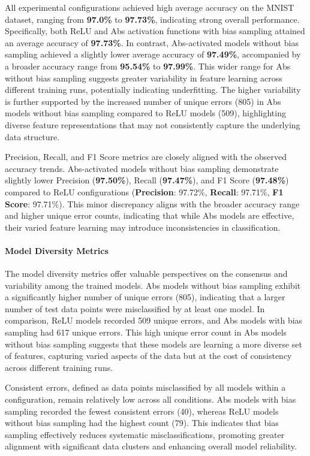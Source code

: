 All experimental configurations achieved high average accuracy on the MNIST dataset, ranging from \textbf{97.0\%} to \textbf{97.73\%}, indicating strong overall performance. Specifically, both ReLU and Abs activation functions with bias sampling attained an average accuracy of \textbf{97.73\%}. In contrast, Abs-activated models without bias sampling achieved a slightly lower average accuracy of \textbf{97.49\%}, accompanied by a broader accuracy range from \textbf{95.54\%} to \textbf{97.99\%}. This wider range for Abs without bias sampling suggests greater variability in feature learning across different training runs, potentially indicating underfitting. The higher variability is further supported by the increased number of unique errors (805) in Abs models without bias sampling compared to ReLU models (509), highlighting diverse feature representations that may not consistently capture the underlying data structure.

Precision, Recall, and F1 Score metrics are closely aligned with the observed accuracy trends. Abs-activated models without bias sampling demonstrate slightly lower Precision (\textbf{97.50\%}), Recall (\textbf{97.47\%}), and F1 Score (\textbf{97.48\%}) compared to ReLU configurations (\textbf{Precision}: 97.72\%, \textbf{Recall}: 97.71\%, \textbf{F1 Score}: 97.71\%). This minor discrepancy aligns with the broader accuracy range and higher unique error counts, indicating that while Abs models are effective, their varied feature learning may introduce inconsistencies in classification.

\paragraph{Model Diversity Metrics}

The model diversity metrics offer valuable perspectives on the consensus and variability among the trained models. Abs models without bias sampling exhibit a significantly higher number of unique errors (805), indicating that a larger number of test data points were misclassified by at least one model. In comparison, ReLU models recorded 509 unique errors, and Abs models with bias sampling had 617 unique errors. This high unique error count in Abs models without bias sampling suggests that these models are learning a more diverse set of features, capturing varied aspects of the data but at the cost of consistency across different training runs.

Consistent errors, defined as data points misclassified by all models within a configuration, remain relatively low across all conditions. Abs models with bias sampling recorded the fewest consistent errors (40), whereas ReLU models without bias sampling had the highest count (79). This indicates that bias sampling effectively reduces systematic misclassifications, promoting greater alignment with significant data clusters and enhancing overall model reliability.

